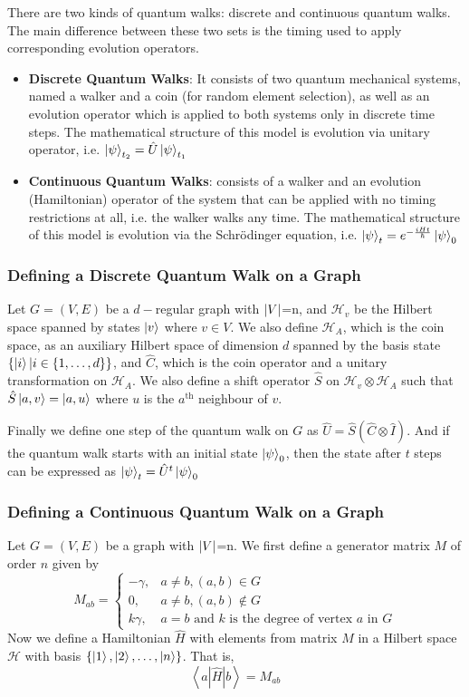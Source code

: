\documentclass[
10pt, %
a4paper, %
oneside, %
headinclude,footinclude, %
BCOR5mm, %
]{scrartcl}
\begin{document}
There are two kinds of quantum walks: discrete and continuous quantum walks. The main difference between these two sets is the timing used to apply corresponding evolution operators.
\begin{itemize}
\item \textbf{Discrete Quantum Walks}: It consists of two quantum mechanical systems, named a walker and a coin (for random element selection), as well as an evolution operator which is applied to both systems only in discrete time steps. The mathematical structure of this model is evolution via unitary operator, i.e. $\ket\psi_{t_2}=\hat{U}\ket\psi_{t_1}$
\item \textbf{Continuous Quantum Walks}: consists of a walker and
an evolution (Hamiltonian) operator of the system that can be applied with no timing restrictions at all, i.e. the walker walks any time. The mathematical structure of this model is evolution via the Schr\"{o}dinger equation, i.e. $\ket\psi_t=e^{-\frac{iHt}{\hbar}}\ket\psi_0$
\end{itemize}

\subsubsection{Defining a Discrete Quantum Walk on a Graph}

Let $G=(V,E)$ be a $d-$regular graph with $\abs{V}$=n, and $\mathcal{H}_v$ be the Hilbert space spanned by states $\ket v$ where $v\in V$. We also define $\mathcal{H}_A$, which is the coin space, as an auxiliary Hilbert space of dimension $d$ spanned by the basis state $\{\ket i|i\in\{1,\ldots,d\}\}$, and $\hat{C}$, which is the coin operator and a unitary transformation on $\mathcal{H}_A$. We also define a shift operator $\hat{S}$ on $\mathcal{H}_v\otimes\mathcal{H}_A$ such that $\hat{S}\ket{a,v}=\ket{a,u}$ where $u$ is the $a^{\text{th}}$ neighbour of $v$.

Finally we define one step of the quantum walk on $G$ as $\hat{U}=\hat{S}\left(\hat{C}\otimes\hat{I}\right)$. And if the quantum walk starts with an initial state $\ket\psi_0$, then the state after $t$ steps can be expressed as $\ket\psi_t=\hat{U}^t\ket\psi_0$

\subsubsection{Defining a Continuous Quantum Walk on a Graph}

Let $G=(V,E)$ be a graph with $\abs{V}$=n. We first define a generator matrix $M$ of order $n$ given by
$$M_{ab}=\begin{cases}
-\gamma,&a\ne b,(a,b)\in G\\
0,&a\ne b,(a,b)\notin G\\
k\gamma,&a=b\text{ and }k\text{ is the degree of vertex }a\text{ in }G
\end{cases}
$$
Now we define a Hamiltonian $\hat{H}$ with elements from matrix $M$ in a Hilbert space $\mathcal{H}$ with basis $\{\ket1,\ket2,\ldots,\ket n\}$. That is,
$$\left<a|\hat{H}|b\right>=M_{ab}$$
\end{document}
